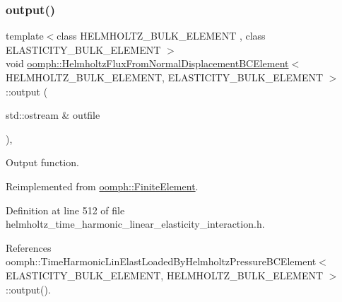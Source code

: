 \subsubsection{\texorpdfstring{output()}{output()}\hspace{0.1cm}{\footnotesize\ttfamily [1/4]}}
{\footnotesize\ttfamily template$<$class H\+E\+L\+M\+H\+O\+L\+T\+Z\+\_\+\+B\+U\+L\+K\+\_\+\+E\+L\+E\+M\+E\+NT , class E\+L\+A\+S\+T\+I\+C\+I\+T\+Y\+\_\+\+B\+U\+L\+K\+\_\+\+E\+L\+E\+M\+E\+NT $>$ \\
void \hyperlink{classoomph_1_1HelmholtzFluxFromNormalDisplacementBCElement}{oomph\+::\+Helmholtz\+Flux\+From\+Normal\+Displacement\+B\+C\+Element}$<$ H\+E\+L\+M\+H\+O\+L\+T\+Z\+\_\+\+B\+U\+L\+K\+\_\+\+E\+L\+E\+M\+E\+NT, E\+L\+A\+S\+T\+I\+C\+I\+T\+Y\+\_\+\+B\+U\+L\+K\+\_\+\+E\+L\+E\+M\+E\+NT $>$\+::output (\begin{DoxyParamCaption}\item[{std\+::ostream \&}]{outfile }\end{DoxyParamCaption})\hspace{0.3cm}{\ttfamily [inline]}, {\ttfamily [virtual]}}



Output function. 



Reimplemented from \hyperlink{classoomph_1_1FiniteElement_a2ad98a3d2ef4999f1bef62c0ff13f2a7}{oomph\+::\+Finite\+Element}.



Definition at line 512 of file helmholtz\+\_\+time\+\_\+harmonic\+\_\+linear\+\_\+elasticity\+\_\+interaction.\+h.



References oomph\+::\+Time\+Harmonic\+Lin\+Elast\+Loaded\+By\+Helmholtz\+Pressure\+B\+C\+Element$<$ E\+L\+A\+S\+T\+I\+C\+I\+T\+Y\+\_\+\+B\+U\+L\+K\+\_\+\+E\+L\+E\+M\+E\+N\+T, H\+E\+L\+M\+H\+O\+L\+T\+Z\+\_\+\+B\+U\+L\+K\+\_\+\+E\+L\+E\+M\+E\+N\+T $>$\+::output().

\mbox{\label{classoomph_1_1HelmholtzFluxFromNormalDisplacementBCElement_aec87ba2999b0c2e58447ca490b987c0e}} 
